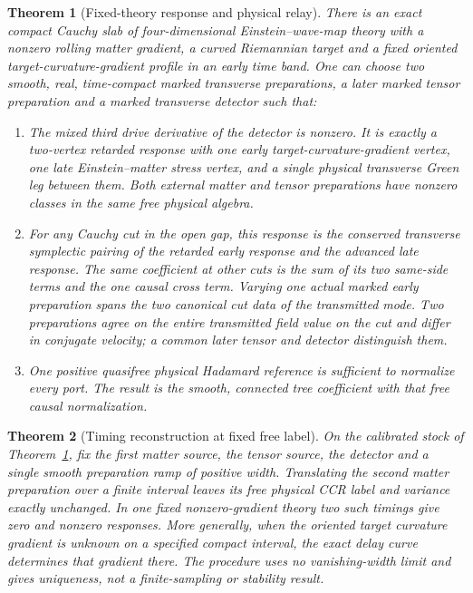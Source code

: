 \documentclass[11pt]{article}
\newtheorem{theorem}{Theorem}
\numberwithin{equation}{section}
\begin{document}
\begin{theorem}[Fixed-theory response and physical relay]\label{thm:main}
There is an exact compact Cauchy slab of four-dimensional Einstein--wave-map theory with a nonzero rolling matter gradient, a curved Riemannian target and a fixed oriented target-curvature-gradient profile in an early time band. One can choose two smooth, real, time-compact marked transverse preparations, a later marked tensor preparation and a marked transverse detector such that:
\begin{enumerate}
\item The mixed third drive derivative of the detector is nonzero. It is exactly a two-vertex retarded response with one early target-curvature-gradient vertex, one late Einstein--matter stress vertex, and a single physical transverse Green leg between them. Both external matter and tensor preparations have nonzero classes in the same free physical algebra.
\item For any Cauchy cut in the open gap, this response is the conserved transverse symplectic pairing of the retarded early response and the advanced late response. The same coefficient at other cuts is the sum of its two same-side terms and the one causal cross term. Varying one actual marked early preparation spans the two canonical cut data of the transmitted mode. Two preparations agree on the entire transmitted field value on the cut and differ in conjugate velocity; a common later tensor and detector distinguish them.
\item One positive quasifree physical Hadamard reference is sufficient to normalize every port. The result is the smooth, connected tree coefficient with that free causal normalization.
\end{enumerate}
\end{theorem}

\begin{theorem}[Timing reconstruction at fixed free label]\label{thm:inverse}
On the calibrated stock of Theorem~\ref{thm:main}, fix the first matter source, the tensor source, the detector and a single smooth preparation ramp of positive width. Translating the second matter preparation over a finite interval leaves its free physical CCR label and variance exactly unchanged. In one fixed nonzero-gradient theory two such timings give zero and nonzero responses. More generally, when the oriented target curvature gradient is unknown on a specified compact interval, the exact delay curve determines that gradient there. The procedure uses no vanishing-width limit and gives uniqueness, not a finite-sampling or stability result.
\end{theorem}
\end{document}
